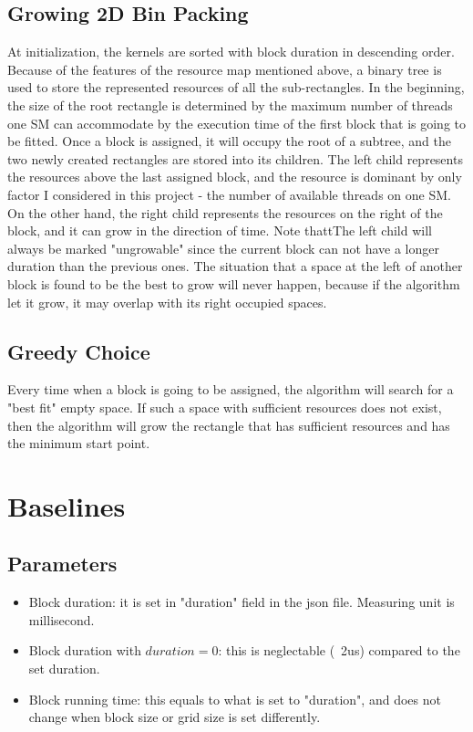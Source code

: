 \documentclass[12pt,journal,compsoc]{IEEEtran}
\begin{document}
\subsection{Growing 2D Bin Packing}
At initialization, the kernels are sorted with block duration in descending order. Because of the features of the resource map mentioned above, a binary tree is used to store the represented resources of all the sub-rectangles. In the beginning, the size of the root rectangle is determined by the maximum number of threads one SM can accommodate by the execution time of the first block that is going to be fitted. Once a block is assigned, it will occupy the root of a subtree, and the two newly created rectangles are stored into its children. The left child represents the resources above the last assigned block, and the resource is dominant by only factor I considered in this project - the number of available threads on one SM. On the other hand, the right child represents the resources on the right of the block, and it can grow in the direction of time. Note thattThe left child will always be marked "ungrowable" since the current block can not have a longer duration than the previous ones. The situation that a space at the left of another block is found to be the best to grow will never happen, because if the algorithm let it grow, it may overlap with its right occupied spaces.
\subsection{Greedy Choice}
Every time when a block is going to be assigned, the algorithm will search for a "best fit" empty space. If such a space with sufficient resources does not exist, then the algorithm will grow the rectangle that has sufficient resources and has the minimum start point.


\section{Baselines}
\subsection{Parameters} 
\begin{itemize}
\item Block duration: it is set in "duration" field in the json file. Measuring unit is millisecond.
\item Block duration with $duration=0$: this is neglectable (~2us) compared to the set duration.
\item Block running time: this equals to what is set to "duration", and does not change when block size or grid size is set differently.
\end{itemize}
\end{document}
